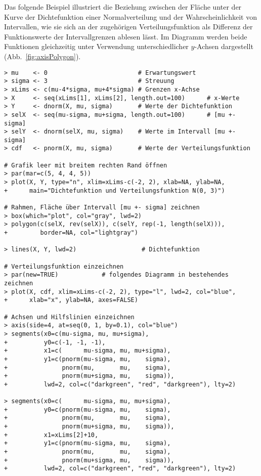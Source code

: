 Das folgende Beispiel illustriert die Beziehung zwischen der Fläche unter der Kurve der Dichtefunktion einer Normalverteilung und der Wahrscheinlichkeit von Intervallen, wie sie sich an der zugehörigen Verteilungsfunktion als Differenz der Funktionswerte der Intervallgrenzen ablesen lässt. Im Diagramm werden beide Funktionen gleichzeitig unter Verwendung unterschiedlicher $y$-Achsen dargestellt (Abb.\ \ref{fig:axisPolygon}).
\begin{lstlisting}
> mu    <- 0                         # Erwartungswert
> sigma <- 3                         # Streuung
> xLims <- c(mu-4*sigma, mu+4*sigma) # Grenzen x-Achse
> X     <- seq(xLims[1], xLims[2], length.out=100)      # x-Werte
> Y     <- dnorm(X, mu, sigma)       # Werte der Dichtefunktion
> selX  <- seq(mu-sigma, mu+sigma, length.out=100)      # [mu +- sigma]
> selY  <- dnorm(selX, mu, sigma)    # Werte im Intervall [mu +- sigma]
> cdf   <- pnorm(X, mu, sigma)       # Werte der Verteilungsfunktion

# Grafik leer mit breitem rechten Rand öffnen
> par(mar=c(5, 4, 4, 5))
> plot(X, Y, type="n", xlim=xLims-c(-2, 2), xlab=NA, ylab=NA,
+      main="Dichtefunktion und Verteilungsfunktion N(0, 3)")

# Rahmen, Fläche über Intervall [mu +- sigma] zeichnen
> box(which="plot", col="gray", lwd=2)
> polygon(c(selX, rev(selX)), c(selY, rep(-1, length(selX))),
+         border=NA, col="lightgray")

> lines(X, Y, lwd=2)                  # Dichtefunktion

# Verteilungsfunktion einzeichnen
> par(new=TRUE)            # folgendes Diagramm in bestehendes zeichnen
> plot(X, cdf, xlim=xLims-c(-2, 2), type="l", lwd=2, col="blue",
+      xlab="x", ylab=NA, axes=FALSE)

# Achsen und Hilfslinien einzeichnen
> axis(side=4, at=seq(0, 1, by=0.1), col="blue")
> segments(x0=c(mu-sigma, mu, mu+sigma),
+          y0=c(-1, -1, -1),
+          x1=c(      mu-sigma, mu, mu+sigma),
+          y1=c(pnorm(mu-sigma, mu,    sigma),
+               pnorm(mu,       mu,    sigma),
+               pnorm(mu+sigma, mu,    sigma)),
+          lwd=2, col=c("darkgreen", "red", "darkgreen"), lty=2)

> segments(x0=c(      mu-sigma, mu, mu+sigma),
+          y0=c(pnorm(mu-sigma, mu,    sigma),
+               pnorm(mu,       mu,    sigma),
+               pnorm(mu+sigma, mu,    sigma)),
+          x1=xLims[2]+10,
+          y1=c(pnorm(mu-sigma, mu,    sigma),
+               pnorm(mu,       mu,    sigma),
+               pnorm(mu+sigma, mu,    sigma)),
+          lwd=2, col=c("darkgreen", "red", "darkgreen"), lty=2)


\end{lstlisting}
